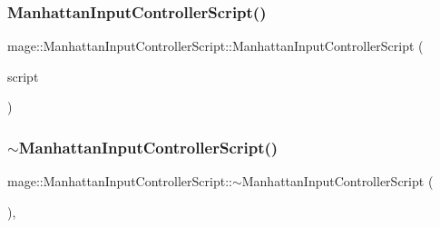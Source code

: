 \hypertarget{classmage_1_1_manhattan_input_controller_script_a5e281b4e16a7b1ead6c31ca742d7d79c}{}\label{classmage_1_1_manhattan_input_controller_script_a5e281b4e16a7b1ead6c31ca742d7d79c} 
\subsubsection{\texorpdfstring{Manhattan\+Input\+Controller\+Script()}{ManhattanInputControllerScript()}\hspace{0.1cm}{\footnotesize\ttfamily [3/3]}}
{\footnotesize\ttfamily mage\+::\+Manhattan\+Input\+Controller\+Script\+::\+Manhattan\+Input\+Controller\+Script (\begin{DoxyParamCaption}\item[{\hyperlink{classmage_1_1_manhattan_input_controller_script}{Manhattan\+Input\+Controller\+Script} \&\&}]{script }\end{DoxyParamCaption})\hspace{0.3cm}{\ttfamily [default]}}

\hypertarget{classmage_1_1_manhattan_input_controller_script_a3cf134df3084aeffc7ac87a066ecb0c4}{}\label{classmage_1_1_manhattan_input_controller_script_a3cf134df3084aeffc7ac87a066ecb0c4} 
\subsubsection{\texorpdfstring{$\sim$\+Manhattan\+Input\+Controller\+Script()}{~ManhattanInputControllerScript()}}
{\footnotesize\ttfamily mage\+::\+Manhattan\+Input\+Controller\+Script\+::$\sim$\+Manhattan\+Input\+Controller\+Script (\begin{DoxyParamCaption}{ }\end{DoxyParamCaption})\hspace{0.3cm}{\ttfamily [virtual]}, {\ttfamily [default]}}



